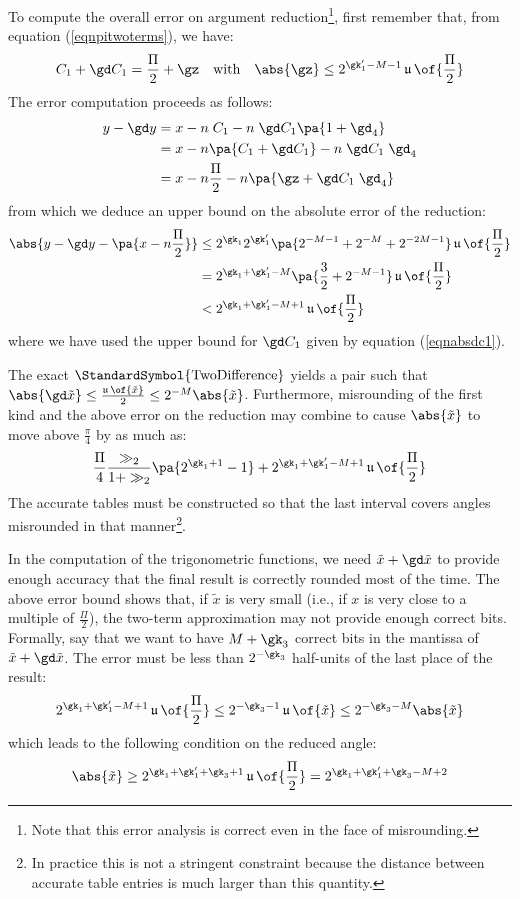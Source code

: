 \documentclass[10pt, a4paper, twoside]{basestyle}
\DeclareMathOperator{\ULP}{\mathfrak u}
\DeclareMathOperator{\twodifference}{\StandardSymbol{TwoDifference}}
\newcommand{\red}[1]{\tilde{#1}}
\begin{document}
To compute the overall error on argument reduction\footnote{Note that this error analysis is correct even in the face of misrounding.}, first remember that, from equation (\ref{eqnpitwoterms}), we have:
\[
C_1 + \gd C_1 = \frac{\Pi}{2} + \gz \quad \text{with} \quad \abs{\gz} \leq 2^{\gk'_1 - M - 1} \ULP\of{\frac{\Pi}{2}}
\]
The error computation proceeds as follows:
\begin{align*}
y - \gd y &= x - n \; C_1 - n \; \gd C_1 \pa{1 + \gd_4} \\
&= x - n \pa{C_1 + \gd C_1} - n \; \gd C_1 \; \gd_4 \\
&= x - n \frac{\Pi}{2} - n \pa{\gz + \gd C_1 \; \gd_4}
\end{align*}
from which we deduce an upper bound on the absolute error of the reduction:
\begin{align*}
\abs{y - \gd y - \pa{x - n \frac{\Pi}{2}}} &\leq 2^{\gk_1} 2^{\gk'_1} \pa{2^{- M - 1} + 2^{-M} + 2^{-2 M - 1}} \ULP\of{\frac{\Pi}{2}} \\
&= 2^{\gk_1 + \gk'_1 - M}\pa{\frac{3}{2} + 2^{-M - 1}} \ULP\of{\frac{\Pi}{2}} \\
&< 2^{\gk_1 + \gk'_1 - M + 1} \ULP\of{\frac{\Pi}{2}}
\end{align*}
where we have used the upper bound for $\gd C_1$ given by equation (\ref{eqnabsdc1}).

The exact $\twodifference$ yields a pair such that $\abs{\gd \red x} \le \frac{\ULP\of{\red x}}{2} \le 2^{-M} \abs{\red x}$.  Furthermore, misrounding of the first kind and the above error on the reduction may combine to cause $\abs{\red x}$ to move above $\frac{\pi}{4}$ by as much as:
\[
\frac{\Pi}{4} \frac{\gg_2}{1 + \gg_2} \pa{2^{\gk_1 + 1} - 1} + 2^{\gk_1 + \gk'_1 - M + 1} \ULP\of{\frac{\Pi}{2}}
\]
The accurate tables must be constructed so that the last interval covers angles misrounded in that manner\footnote{In practice this is not a stringent constraint because the distance between accurate table entries is much larger than this quantity.}.

In the computation of the trigonometric functions, we need $\red x + \gd \red x$ to provide enough accuracy that the final result is correctly rounded most of the time.  The above error bound shows that, if $\red x$ is very small (i.e., if $x$ is very close to a multiple of $\frac{\Pi}{2}$), the two-term approximation may not provide enough correct bits.  Formally, say that we want to have $M + \gk_3$ correct bits in the mantissa of $\red x + \gd \red x$.  The error must be less than $2^{-\gk_3}$ half-units of the last place of the result:
\begin{equation}
2^{\gk_1 + \gk'_1 - M + 1} \ULP\of{\frac{\Pi}{2}} \leq 2^{-\gk_3 - 1} \ULP\of{\red x} \leq 2^{-\gk_3 - M} \abs{\red x}
\label{eqnreductionbound}
\end{equation}
which leads to the following condition on the reduced angle:
\[
\abs{\red x} \geq 2^{\gk_1 + \gk'_1 + \gk_3 + 1} \ULP\of{\frac{\Pi}{2}} = 2^{\gk_1 + \gk'_1 + \gk_3 - M + 2}
\]
\end{document}
